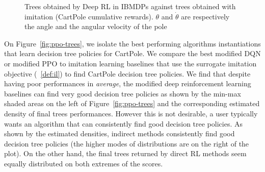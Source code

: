 \begin{figure}[htbp]
    \caption{Trees obtained by Deep RL in IBMDPs against trees obtained with imitation (CartPole cumulative rewards). $\theta$ and $\dot{\theta}$ are respectively the angle and the angular velocity of the pole}
    \label{fig:trees-drl}
\end{figure}


On Figure~\ref{fig:ppo-trees}, we isolate the best performing algorithms instantiations that learn decision tree policies for CartPole.
We compare the best modified DQN or modified PPO to imitation learning baselines that use the surrogate imitation objective (~\ref{def:il}) to find CartPole decision tree policies.
We find that despite having poor performances in \textit{average}, the modified deep reinforcement learning baselines can find very good decision tree policies as shown by the min-max shaded areas on the left of Figure~\ref{fig:ppo-trees} and the corresponding estimated density of final trees performances.
However this is not desirable, a user typically wants an algorithm that can consistently find good decision tree policies.
As shown by the estimated densities, indirect methods consistently find good decision tree policies (the higher modes of distributions are on the right of the plot).
On the other hand, the final trees returned by direct RL methods seem equally distributed on both extremes of the scores.

